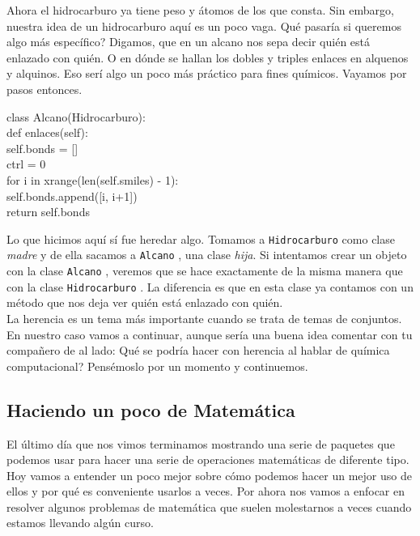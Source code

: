 \documentclass[10pt,letterpaper]{article}
\newcommand{\inlinecode}[1]{
\colorbox{light-gray}{\texttt{#1}}
}
\newenvironment{Code}
{
\begin{lrbox}{\selvestebox}%
\begin{minipage}{\dimexpr\columnwidth-2\fboxsep\relax}
\fontfamily{\ttdefault}\selectfont
}
{\end{minipage}\end{lrbox}%
\begin{center}
\colorbox{light-gray}{\usebox{\selvestebox}}
\end{center}
}
\begin{document}
Ahora el hidrocarburo ya tiene peso y \'atomos de los que consta. Sin embargo, nuestra idea de un hidrocarburo aqu\'i es un poco vaga. Qu\'e pasar\'ia si queremos algo m\'as espec\'ifico? Digamos, que en un alcano nos sepa decir qui\'en est\'a enlazado con qui\'en. O en d\'onde se hallan los dobles y triples enlaces en alquenos y alquinos. Eso ser\'i algo un poco m\'as pr\'actico para fines qu\'imicos. Vayamos por pasos entonces.

\begin{footnotesize}
\begin{Code}
class Alcano(Hidrocarburo):\\
\hspace*{4mm} def enlaces(self):\\
\hspace*{10mm} self.bonds = []\\
\hspace*{10mm} ctrl = 0\\
\hspace*{10mm} for i in xrange(len(self.smiles) - 1):\\
\hspace*{17mm} self.bonds.append([i, i+1])\\
\hspace*{10mm} return self.bonds
\end{Code}
\end{footnotesize}

Lo que hicimos aqu\'i s\'i fue heredar algo. Tomamos a \inlinecode{Hidrocarburo} como clase \emph{madre} y de ella sacamos a \inlinecode{Alcano}, una clase \emph{hija}. Si intentamos crear un objeto con la clase \inlinecode{Alcano}, veremos que se hace exactamente de la misma manera que con la clase \inlinecode{Hidrocarburo}. La diferencia es que en esta clase ya contamos con un m\'etodo que nos deja ver qui\'en est\'a enlazado con qui\'en.\\

La herencia es un tema m\'as importante cuando se trata de temas de conjuntos. En nuestro caso vamos a continuar, aunque ser\'ia una buena idea comentar con tu compa\~nero de al lado: Qu\'e se podr\'ia hacer con herencia al hablar de qu\'imica computacional? Pens\'emoslo por un momento y continuemos.

\subsection{Haciendo un poco de Matem\'atica}
El \'ultimo d\'ia que nos vimos terminamos mostrando una serie de paquetes que podemos usar para hacer una serie de operaciones matem\'aticas de diferente tipo. Hoy vamos a entender un poco mejor sobre c\'omo podemos hacer un mejor uso de ellos y por qu\'e es conveniente usarlos a veces. Por ahora nos vamos a enfocar en resolver algunos problemas de matem\'atica que suelen molestarnos a veces cuando estamos llevando alg\'un curso.\\
\end{document}
